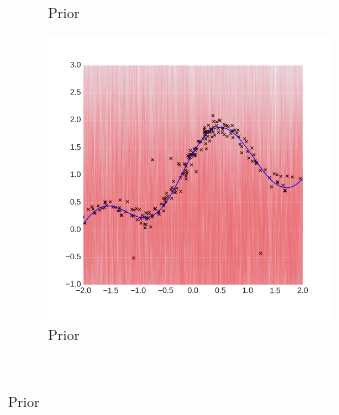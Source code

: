\documentclass{article} %
\begin{document}
\begin{figure}
        \centering
        \begin{subfigure}[b]{0.49\textwidth} \centering
                
                \caption{Prior}
                \label{fig:NealpriorStruct}
        \end{subfigure}%
        \begin{subfigure}[b]{0.49\textwidth} \centering
                \includegraphics[height=7.5cm]{figs/neal_se_1final.png}
                \caption{Prior}
                \label{fig:NealBO}
        \end{subfigure}%
        ~ %
          

\end{figure}
\end{document}

